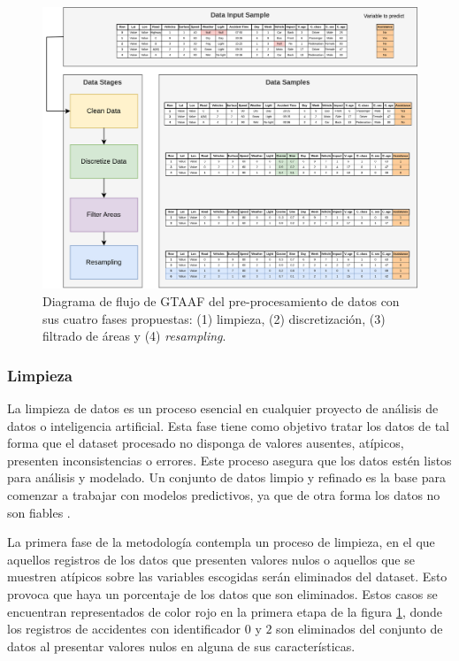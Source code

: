 \documentclass{uathesis-es}
\begin{document}
\begin{figure}[H]
    \centering
    \includegraphics[width=17cm]{Figures/Preprocessing.png}
    \caption{Diagrama de flujo de GTAAF del pre-procesamiento de datos con sus cuatro fases propuestas: (1) limpieza, (2) discretización, (3) filtrado de áreas y (4) \textit{resampling}.}
    \label{PreprocessingStage}
\end{figure}

\subsubsection{Limpieza}

La limpieza de datos es un proceso esencial en cualquier proyecto de análisis de datos o inteligencia artificial. Esta fase tiene como objetivo tratar los datos de tal forma que el dataset procesado no disponga de valores ausentes, atípicos, presenten inconsistencias o errores. Este proceso asegura que los datos estén listos para análisis y modelado. Un conjunto de datos limpio y refinado es la base para comenzar a trabajar con modelos predictivos, ya que de otra forma los datos no son fiables \cite{ilyas2019data}.

La primera fase de la metodología contempla un proceso de limpieza, en el que aquellos registros de los datos que presenten valores nulos o aquellos que se muestren atípicos sobre las variables escogidas serán eliminados del dataset. Esto provoca que haya un porcentaje de los datos que son eliminados. Estos casos se encuentran representados de color rojo en la primera etapa de la figura \ref{PreprocessingStage}, donde los registros de accidentes con identificador $0$ y $2$ son eliminados del conjunto de datos al presentar valores nulos en alguna de sus características.
\end{document}
